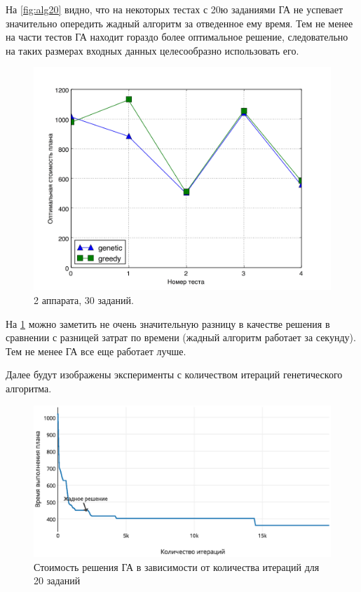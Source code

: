 \documentclass[a4paper,14pt,russian]{article}
\begin{document}
На \cref{fig:alg20} видно, что на некоторых тестах с 20ю заданиями ГА не успевает значительно опередить жадный алгоритм за отведенное ему время. Тем не менее на части тестов ГА находит гораздо более оптимальное решение, следовательно на таких размерах входных данных целесообразно использовать его.

\begin{figure}[here]
\includegraphics[scale=0.6]{images/test_small3.jpg}
\caption{2 аппарата, 30 заданий.}
\label{fig:alg30}
\end{figure}
\pagebreak

На \cref{fig:alg30} можно заметить не очень значительную разницу в качестве решения в сравнении с разницей затрат по времени (жадный алгоритм работает за секунду). Тем не менее ГА все еще работает лучше.

Далее будут изображены эксперименты с количеством итераций генетического алгоритма.

\begin{figure}[here]
\includegraphics[scale=0.8]{images/iter-value-20-plot.eps}
\caption{Стоимость решения ГА в зависимости от количества итераций для 20 заданий}
\label{fig:iter-20}
\end{figure}
\end{document}
